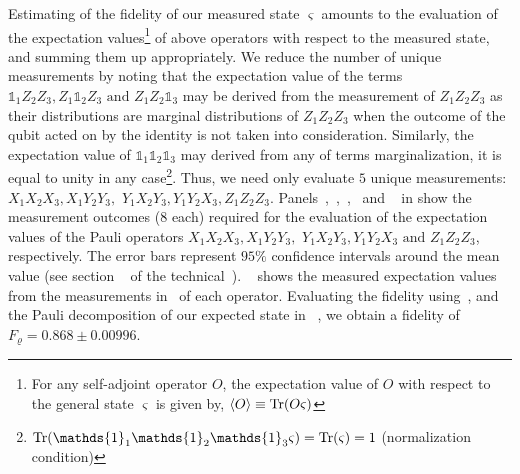 \noindent
Estimating of the fidelity of our measured state $\varsigma$ amounts to the evaluation of the expectation values\footnote{For any self-adjoint operator $O$, the expectation value of $O$ with respect to the general state $\varsigma$ is given by, $\expval{O} \equiv \Tr(O\varsigma)$} of above operators with respect to the measured state, and summing them up appropriately.  We reduce the number of unique measurements by noting that the expectation value of the terms $\mathds{1}_1Z_2Z_3, Z_1\mathds{1}_2Z_3 \text{ and } Z_1Z_2\mathds{1}_3$ may be derived from the measurement of $Z_1Z_2Z_3$ as their distributions are marginal distributions of $Z_1Z_2Z_3$ when the outcome of the qubit acted on by the identity is not taken into consideration. Similarly, the expectation value of  $\mathds{1}_1\mathds{1}_2\mathds{1}_3$ may derived from any of terms \via marginalization, it is equal to unity in any case\footnote{$\Tr(\mathds{1}_1\mathds{1}_2\mathds{1}_3 \varsigma) = \Tr(\varsigma) = 1$ (normalization condition)}. Thus, we need only evaluate $5$ unique measurements: $X_1X_2X_3, X_1Y_2Y_3,$ $Y_1X_2Y_3,Y_1Y_2X_3, Z_1Z_2Z_3$. Panels~,~,~,~ and ~ in  show the measurement outcomes ($8$ each) required for the evaluation of the expectation values of the Pauli operators $X_1X_2X_3, X_1Y_2Y_3,$ $Y_1X_2Y_3,Y_1Y_2X_3 \text{ and } Z_1Z_2Z_3$, respectively.  The error bars represent $95\%$ confidence intervals around the mean value (see section ~ of the technical~). ~ shows the measured expectation values from the measurements in~ of each operator. Evaluating the fidelity using~, and the Pauli decomposition of our expected state in  ~, we obtain a fidelity of $F_{\varrho}=  0.868\pm0.00996$.

\clearpage

